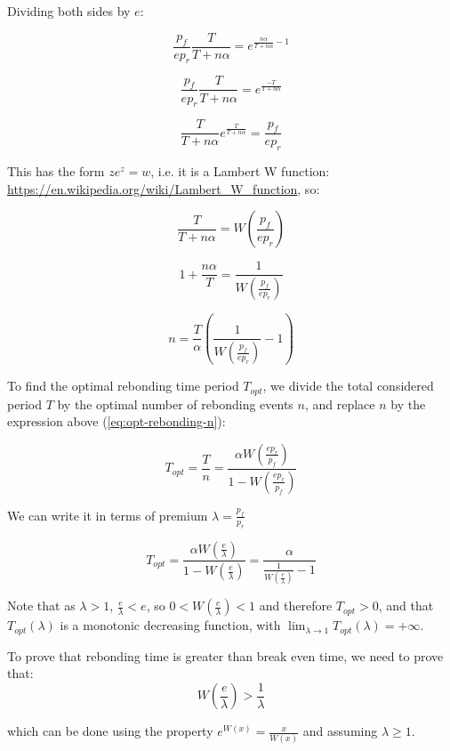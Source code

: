 \documentclass{article}
\begin{document}
Dividing both sides by $e$:

\[
\frac{p_f}{e p_r} \frac{T}{T+n\alpha} = e^{\frac{n\alpha}{T+n\alpha} - 1}
\]

\[
\frac{p_f}{e p_r} \frac{T}{T+n\alpha} = e^{\frac{-T}{T+n\alpha}}
\]

\[
\frac{T}{T+n\alpha} e^{\frac{T}{T+n\alpha}} = \frac{p_f}{e p_r} 
\]

This has the form $z e^z = w$, i.e. it is a Lambert W function: \url{https://en.wikipedia.org/wiki/Lambert_W_function}, so:

\[
\frac{T}{T+n\alpha} = W\left(\frac{p_f}{e p_r} \right)
\]

\[
1 + \frac{n\alpha}{T} = \frac{1}{W\left(\frac{p_f}{e p_r} \right)}
\]

\begin{equation}
  \label{eq:opt-rebonding-n}
n = \frac{T}{\alpha} \left(\frac{1}{W\left(\frac{p_f}{e p_r} \right)} - 1\right)
\end{equation}

To find the optimal rebonding time period $T_{opt}$, we divide the total considered period $T$ by the optimal number of rebonding events $n$, and replace $n$ by the expression above (\ref{eq:opt-rebonding-n}):

\begin{equation}
  \label{eq:opt-rebonding-prices}
T_{opt} = \frac{T}{n} = \frac{\alpha W\left(\frac{e p_r}{p_f}\right)}{1 - W\left(\frac{e p_r}{p_f}\right)}
\end{equation}

We can write it in terms of premium $\lambda = \frac{p_f}{p_r}$

\begin{equation}
  \label{eq:opt-rebonding-premium}
T_{opt} = \frac{\alpha W\left(\frac{e}{\lambda}\right)}{1 - W\left(\frac{e}{\lambda}\right)} = \frac{\alpha}{\frac{1}{W\left(\frac{e}{\lambda}\right)} - 1}
\end{equation}

Note that as $\lambda > 1$, $\frac{e}{\lambda} < e$, so $0 < W(\frac{e}{\lambda}) < 1$ and therefore $T_{opt} > 0$, and that $T_{opt}(\lambda)$ is a monotonic decreasing function, with $\lim_{\lambda \rightarrow 1}T_{opt}(\lambda) = +\infty$.

To prove that rebonding time is greater than break even time, we need to prove that:
\[
W\left(\frac{e}{\lambda}\right) > \frac{1}{\lambda}
\]

which can be done using the property $e^{W(x)} = \frac{x}{W(x)}$ and assuming $\lambda \ge 1$.
\end{document}
